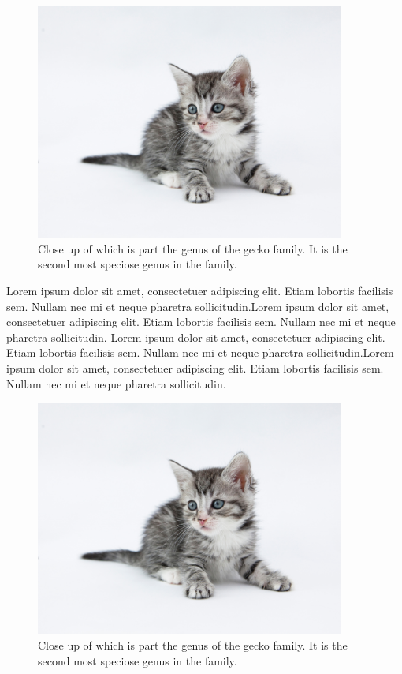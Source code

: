 \documentclass[12pt]{article}
\begin{document}
\begin{figure}[!h]
	\centering
	\includegraphics[width=4in]{./kitten2.jpg}
	\caption[Close up of ]
	{Close up of which is part the genus of the gecko family. It is the second most speciose genus in the family.}
\end{figure}






\newpage




Lorem ipsum dolor sit amet, consectetuer adipiscing elit. 
Etiam lobortis facilisis sem. Nullam nec mi et neque pharetra sollicitudin.Lorem ipsum dolor sit amet, consectetuer adipiscing elit. Etiam lobortis facilisis sem. Nullam nec mi et neque pharetra sollicitudin. Lorem ipsum dolor sit amet, consectetuer adipiscing elit. 
Etiam lobortis facilisis sem. Nullam nec mi et neque pharetra sollicitudin.Lorem ipsum dolor sit amet, consectetuer adipiscing elit. Etiam lobortis facilisis sem. Nullam nec mi et neque pharetra sollicitudin. 

\vspace{40pt}

\begin{figure}[!b]
	\centering
	\includegraphics[width=4in]{./kitten2.jpg}
	\caption[Close up of ]
	{Close up of which is part the genus of the gecko family. It is the second most speciose genus in the family.}
\end{figure}
\end{document}
